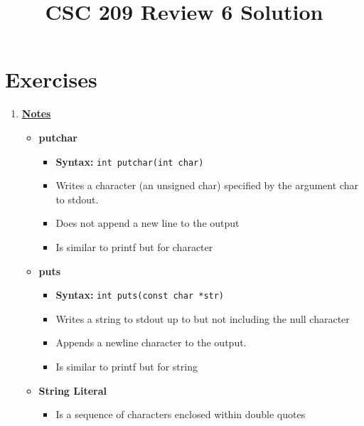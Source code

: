\documentclass[12pt]{article}
\begin{document}
\title{CSC 209 Review 6 Solution}
\maketitle

\bigskip

\section{Exercises}

\begin{enumerate}[1.]
    \item

    \bigskip

    \underline{\textbf{Notes}}

    \begin{itemize}
        \item \textbf{putchar}

        \begin{itemize}
            \item \textbf{Syntax:} \texttt{int putchar(int char)}
            \item Writes a character (an unsigned char) specified by the argument char to stdout.
            \item Does not append a new line to the output
            \item Is similar to printf but for character
        \end{itemize}

        \item \textbf{puts}

        \begin{itemize}
            \item \textbf{Syntax:} \texttt{int puts(const char *str)}
            \item Writes a string to stdout up to but not including the null character
            \item Appends a newline character to the output.
            \item Is similar to printf but for string
        \end{itemize}

        \item \textbf{String Literal}
        \begin{itemize}
            \item Is a sequence of characters enclosed within double quotes

            \bigskip


\end{itemize}
\end{itemize}
\end{enumerate}
\end{document}

